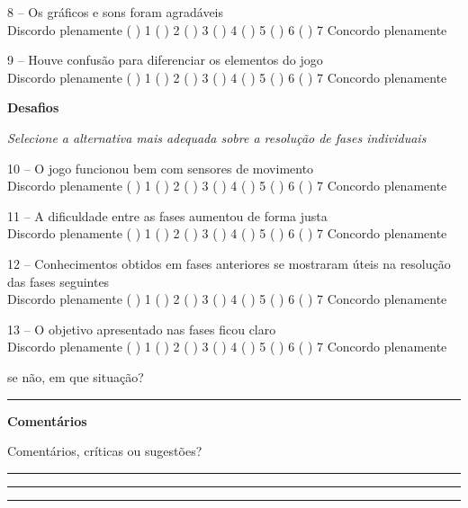 8 – Os gráficos e sons foram agradáveis \\
Discordo plenamente ( ) 1 ( ) 2 ( ) 3 ( ) 4 ( ) 5 ( ) 6 ( ) 7 Concordo plenamente

9 – Houve confusão para diferenciar os elementos do jogo \\
Discordo plenamente ( ) 1 ( ) 2 ( ) 3 ( ) 4 ( ) 5 ( ) 6 ( ) 7 Concordo plenamente

\textbf{Desafios}

\textit{Selecione a alternativa mais adequada sobre a resolução de fases individuais}


10 – O jogo funcionou bem com sensores de movimento \\
Discordo plenamente ( ) 1 ( ) 2 ( ) 3 ( ) 4 ( ) 5 ( ) 6 ( ) 7 Concordo plenamente

11 – A dificuldade entre as fases aumentou de forma justa \\
Discordo plenamente ( ) 1 ( ) 2 ( ) 3 ( ) 4 ( ) 5 ( ) 6 ( ) 7 Concordo plenamente

12 – Conhecimentos obtidos em fases anteriores se mostraram úteis na resolução das fases seguintes \\
Discordo plenamente ( ) 1 ( ) 2 ( ) 3 ( ) 4 ( ) 5 ( ) 6 ( ) 7 Concordo plenamente

13 – O objetivo apresentado nas fases ficou claro \\
Discordo plenamente ( ) 1 ( ) 2 ( ) 3 ( ) 4 ( ) 5 ( ) 6 ( ) 7 Concordo plenamente

se não, em que situação? 

\rule{\linewidth-\marginparwidth}{0.4pt}

\textbf{Comentários}

Comentários, críticas ou sugestões?

\rule{\linewidth-\marginparwidth}{0.4pt}

\rule{\linewidth-\marginparwidth}{0.4pt}

\rule{\linewidth-\marginparwidth}{0.4pt}